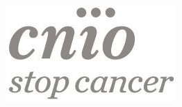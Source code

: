 \begin{titlepage}
\begin{minipage}[t]{0.17\textwidth}
        \includegraphics[width=\textwidth]{img/cnio_logo.png}
    \end{minipage}

\end{titlepage}
